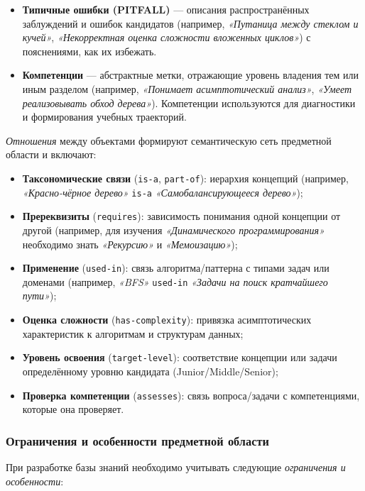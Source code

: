 \begin{itemize}
    \item \textbf{Типичные ошибки (PITFALL)} — описания распространённых заблуждений и ошибок кандидатов (например, \textit{«Путаница между стеклом и кучей»}, \textit{«Некорректная оценка сложности вложенных циклов»}) с пояснениями, как их избежать.
    
    \item \textbf{Компетенции} — абстрактные метки, отражающие уровень владения тем или иным разделом (например, \textit{«Понимает асимптотический анализ»}, \textit{«Умеет реализовывать обход дерева»}). Компетенции используются для диагностики и формирования учебных траекторий.
\end{itemize}

\textit{Отношения} между объектами формируют семантическую сеть предметной области и включают:

\begin{itemize}
    \item \textbf{Таксономические связи} (\texttt{is-a}, \texttt{part-of}): иерархия концепций (например, \textit{«Красно-чёрное дерево»} \texttt{is-a} \textit{«Самобалансирующееся дерево»});
    \item \textbf{Пререквизиты} (\texttt{requires}): зависимость понимания одной концепции от другой (например, для изучения \textit{«Динамического программирования»} необходимо знать \textit{«Рекурсию»} и \textit{«Мемоизацию»});
    \item \textbf{Применение} (\texttt{used-in}): связь алгоритма/паттерна с типами задач или доменами (например, \textit{«BFS»} \texttt{used-in} \textit{«Задачи на поиск кратчайшего пути»});
    \item \textbf{Оценка сложности} (\texttt{has-complexity}): привязка асимптотических характеристик к алгоритмам и структурам данных;
    \item \textbf{Уровень освоения} (\texttt{target-level}): соответствие концепции или задачи определённому уровню кандидата (Junior/Middle/Senior);
    \item \textbf{Проверка компетенции} (\texttt{assesses}): связь вопроса/задачи с компетенциями, которые она проверяет.
\end{itemize}

\subsubsection*{Ограничения и особенности предметной области}

При разработке базы знаний необходимо учитывать следующие \textit{ограничения и особенности}:

